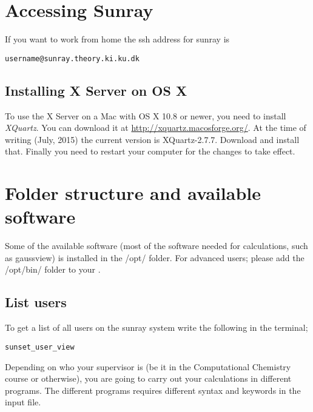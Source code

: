 \documentclass{article}
\begin{document}
\newpage
\section{Accessing Sunray}

If you want to work from home the ssh address for sunray is

\begin{lstlisting}
username@sunray.theory.ki.ku.dk
\end{lstlisting}



\subsection{Installing X Server on OS X}
To use the X Server on a Mac with OS X 10.8 or newer, you need to install \emph{XQuartz}. You
can download it at \url{http://xquartz.macosforge.org/}. At the time of
writing (July, 2015) the current version is XQuartz-2.7.7. Download and install that. Finally
you need to restart your computer for the changes to take effect. 



\newpage
\section{Folder structure and available software}

Some of the available software (most of the software needed for calculations, such as gaussview) is installed in the /opt/ folder. For advanced users; please add the /opt/bin/ folder to your .\\

\subsection*{List users}

To get a list of all users on the sunray system write the following in the terminal;

\begin{lstlisting}
sunset_user_view
\end{lstlisting}



Depending on who your supervisor is (be it in the Computational Chemistry course or otherwise), you are going to carry out your calculations in different programs.
The different programs requires different syntax and keywords in the input file.\\
\end{document}
